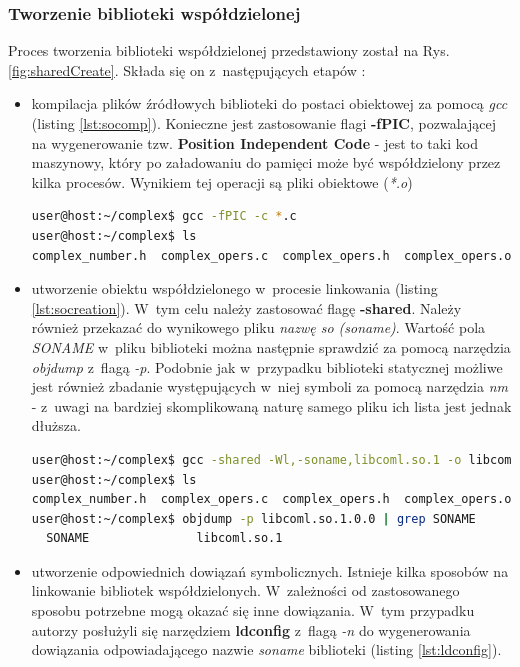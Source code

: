 \subsubsection*{Tworzenie biblioteki współdzielonej}
Proces tworzenia biblioteki współdzielonej przedstawiony został na Rys. \ref{fig:sharedCreate}. Składa się on z~następujących etapów \cite{Shared1}:
\begin{itemize}
\item kompilacja plików źródłowych biblioteki do postaci obiektowej za pomocą \textit{gcc} (listing \ref{lst:socomp}). Konieczne jest zastosowanie flagi \textbf{-fPIC}, pozwalającej na wygenerowanie tzw. \textbf{Position Independent Code} - jest to taki kod maszynowy, który po załadowaniu do pamięci może być współdzielony przez kilka procesów. Wynikiem tej operacji są pliki obiektowe (\textit{*.o})

\begin{lstlisting}[language=bash, language=Cmd, caption={Kompilacja plików źródłowych biblioteki (zastosowanie flagi -fPIC)}, label={lst:socomp}]
user@host:~/complex$ gcc -fPIC -c *.c
user@host:~/complex$ ls
complex_number.h  complex_opers.c  complex_opers.h  complex_opers.o
\end{lstlisting}

\item utworzenie obiektu współdzielonego w~procesie linkowania (listing \ref{lst:socreation}). W~tym celu należy zastosować flagę \textbf{-shared}. Należy również przekazać do wynikowego pliku \textit{nazwę so (soname)}. Wartość pola \textit{SONAME} w~pliku biblioteki można następnie sprawdzić za pomocą narzędzia \textit{objdump} z~flagą \textit{-p}. Podobnie jak w~przypadku biblioteki statycznej możliwe jest również zbadanie występujących w~niej symboli za pomocą narzędzia \textit{nm} - z~uwagi na bardziej skomplikowaną naturę samego pliku ich lista jest jednak dłuższa. 

\begin{lstlisting}[language=bash, language=Cmd, caption={Utworzenie biblioteki współdzielonej, zbadanie wartości pola \textit{SONAME} w~utworzonym pliku}, label={lst:socreation}]
user@host:~/complex$ gcc -shared -Wl,-soname,libcoml.so.1 -o libcoml.so.1.0.0 *.o
user@host:~/complex$ ls
complex_number.h  complex_opers.c  complex_opers.h  complex_opers.o  libcoml.so.1.0.0
user@host:~/complex$ objdump -p libcoml.so.1.0.0 | grep SONAME
  SONAME               libcoml.so.1
\end{lstlisting}

\item utworzenie odpowiednich dowiązań symbolicznych. Istnieje kilka sposobów na linkowanie bibliotek współdzielonych. W~zależności od zastosowanego sposobu potrzebne mogą okazać się inne dowiązania. W~tym przypadku autorzy posłużyli się narzędziem \textbf{ldconfig} z~flagą \textit{-n} do wygenerowania dowiązania odpowiadającego nazwie \textit{soname} biblioteki (listing \ref{lst:ldconfig}).


\end{itemize}
